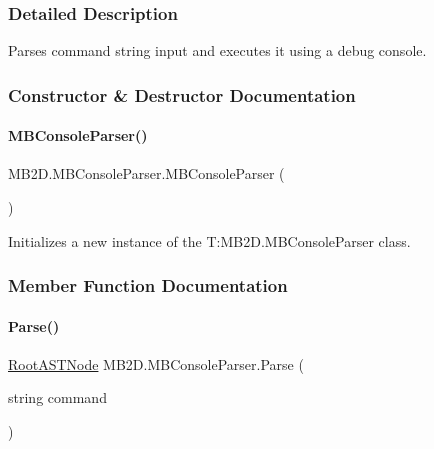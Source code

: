\subsubsection{Detailed Description}
Parses command string input and executes it using a debug console. 



\subsubsection{Constructor \& Destructor Documentation}
\hypertarget{class_m_b2_d_1_1_m_b_console_parser_ad14d20f3d88fade887577eb105837008}{}\label{class_m_b2_d_1_1_m_b_console_parser_ad14d20f3d88fade887577eb105837008} 
\paragraph{\texorpdfstring{M\+B\+Console\+Parser()}{MBConsoleParser()}}
{\footnotesize\ttfamily M\+B2\+D.\+M\+B\+Console\+Parser.\+M\+B\+Console\+Parser (\begin{DoxyParamCaption}{ }\end{DoxyParamCaption})\hspace{0.3cm}{\ttfamily [inline]}}



Initializes a new instance of the T\+:\+M\+B2\+D.\+M\+B\+Console\+Parser class. 



\subsubsection{Member Function Documentation}
\hypertarget{class_m_b2_d_1_1_m_b_console_parser_a880d5a9c56db05d19610df482b15bbf0}{}\label{class_m_b2_d_1_1_m_b_console_parser_a880d5a9c56db05d19610df482b15bbf0} 
\paragraph{\texorpdfstring{Parse()}{Parse()}}
{\footnotesize\ttfamily \hyperlink{class_m_b2_d_1_1_root_a_s_t_node}{Root\+A\+S\+T\+Node} M\+B2\+D.\+M\+B\+Console\+Parser.\+Parse (\begin{DoxyParamCaption}\item[{string}]{command }\end{DoxyParamCaption})\hspace{0.3cm}{\ttfamily [inline]}}



